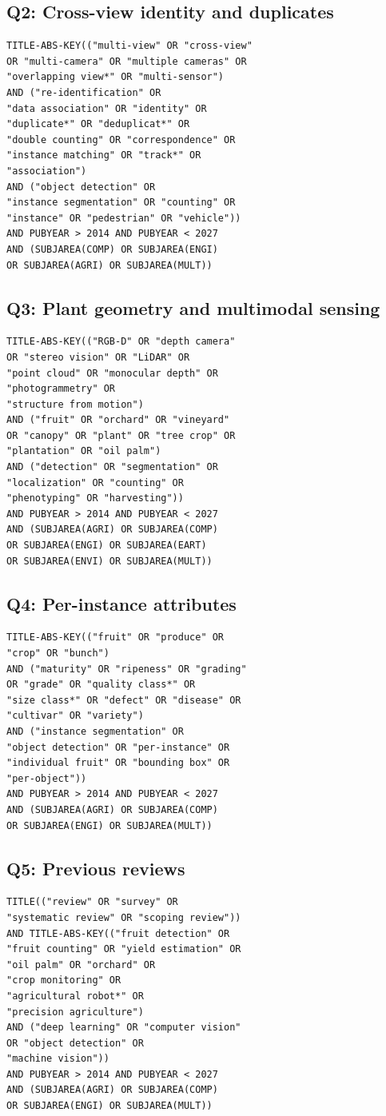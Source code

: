 \subsection*{Q2: Cross-view identity and duplicates}
\begin{verbatim}
TITLE-ABS-KEY(("multi-view" OR "cross-view"
OR "multi-camera" OR "multiple cameras" OR
"overlapping view*" OR "multi-sensor")
AND ("re-identification" OR
"data association" OR "identity" OR
"duplicate*" OR "deduplicat*" OR
"double counting" OR "correspondence" OR
"instance matching" OR "track*" OR
"association")
AND ("object detection" OR
"instance segmentation" OR "counting" OR
"instance" OR "pedestrian" OR "vehicle"))
AND PUBYEAR > 2014 AND PUBYEAR < 2027
AND (SUBJAREA(COMP) OR SUBJAREA(ENGI)
OR SUBJAREA(AGRI) OR SUBJAREA(MULT))
\end{verbatim}

\subsection*{Q3: Plant geometry and multimodal sensing}
\begin{verbatim}
TITLE-ABS-KEY(("RGB-D" OR "depth camera"
OR "stereo vision" OR "LiDAR" OR
"point cloud" OR "monocular depth" OR
"photogrammetry" OR
"structure from motion")
AND ("fruit" OR "orchard" OR "vineyard"
OR "canopy" OR "plant" OR "tree crop" OR
"plantation" OR "oil palm")
AND ("detection" OR "segmentation" OR
"localization" OR "counting" OR
"phenotyping" OR "harvesting"))
AND PUBYEAR > 2014 AND PUBYEAR < 2027
AND (SUBJAREA(AGRI) OR SUBJAREA(COMP)
OR SUBJAREA(ENGI) OR SUBJAREA(EART)
OR SUBJAREA(ENVI) OR SUBJAREA(MULT))
\end{verbatim}

\subsection*{Q4: Per-instance attributes}
\begin{verbatim}
TITLE-ABS-KEY(("fruit" OR "produce" OR
"crop" OR "bunch")
AND ("maturity" OR "ripeness" OR "grading"
OR "grade" OR "quality class*" OR
"size class*" OR "defect" OR "disease" OR
"cultivar" OR "variety")
AND ("instance segmentation" OR
"object detection" OR "per-instance" OR
"individual fruit" OR "bounding box" OR
"per-object"))
AND PUBYEAR > 2014 AND PUBYEAR < 2027
AND (SUBJAREA(AGRI) OR SUBJAREA(COMP)
OR SUBJAREA(ENGI) OR SUBJAREA(MULT))
\end{verbatim}

\subsection*{Q5: Previous reviews}
\begin{verbatim}
TITLE(("review" OR "survey" OR
"systematic review" OR "scoping review"))
AND TITLE-ABS-KEY(("fruit detection" OR
"fruit counting" OR "yield estimation" OR
"oil palm" OR "orchard" OR
"crop monitoring" OR
"agricultural robot*" OR
"precision agriculture")
AND ("deep learning" OR "computer vision"
OR "object detection" OR
"machine vision"))
AND PUBYEAR > 2014 AND PUBYEAR < 2027
AND (SUBJAREA(AGRI) OR SUBJAREA(COMP)
OR SUBJAREA(ENGI) OR SUBJAREA(MULT))
\end{verbatim}

